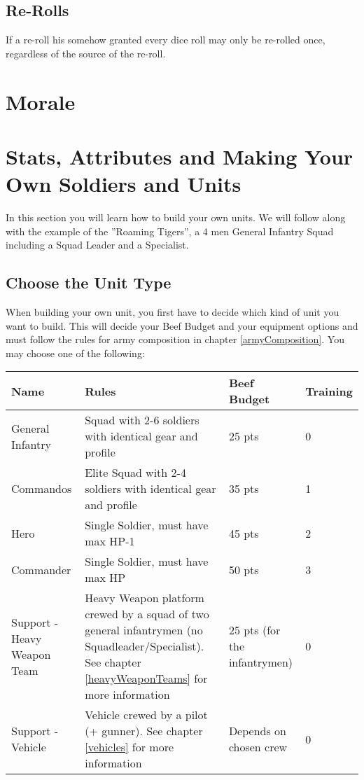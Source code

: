 \documentclass[
	11pt,
	toc=bibliography
	]{article}
\begin{document}
\subsection{Re-Rolls}\label{reRolls}
If a re-roll his somehow granted every dice roll may only be re-rolled once, regardless of the source of the re-roll.

\section{Morale}\label{morale}

\section{Stats, Attributes and Making Your Own Soldiers and Units}\label{statsAttributesMakingSoldiers}
In this section you will learn how to build your own units. We will follow along with the example of the ''Roaming Tigers'', a 4 men General Infantry Squad including a Squad Leader and a Specialist.
\subsection{Choose the Unit Type}
When building your own unit, you first have to decide which kind of unit you want to build. This will decide your Beef Budget and your equipment options and must follow the rules for army composition in chapter \ref{armyComposition}. You may choose one of the following:
{\renewcommand{\arraystretch}{2}
\begin{longtable}{V{.3\textwidth} V{.4\textwidth} V{.2\textwidth}V{.1\textwidth} }
\bf Name & \bf Rules & \bf Beef Budget & \bf Training \\ 
\hline 
General Infantry & Squad with 2-6 soldiers with identical gear and profile & 25 pts & 0\\ 
Commandos & Elite Squad with 2-4 soldiers with identical gear and profile & 35 pts & 1\\ 
Hero & Single Soldier, must have max HP-1 & 45 pts & 2\\ 
Commander & Single Soldier, must have max HP & 50 pts  & 3\\ 
Support - Heavy Weapon Team & Heavy Weapon platform crewed by a squad of two general infantrymen (no Squadleader/Specialist). See chapter \ref{heavyWeaponTeams} for more information & 25 pts (for the infantrymen) & 0\\ 
Support - Vehicle & Vehicle crewed by a pilot (+ gunner). See chapter \ref{vehicles} for more information & Depends on chosen crew & 0\\ 
\end{longtable}}
\end{document}
